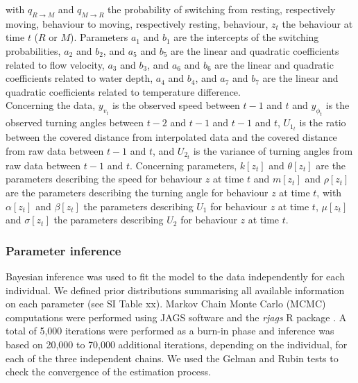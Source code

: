 \documentclass{article}
\begin{document}
\begin{linenumbers}
with $q_{R \rightarrow M}$ and $q_{M \rightarrow R}$ the probability of switching from resting, respectively moving, behaviour to moving, respectively resting, behaviour, $z_{t}$ the behaviour at time $t$ ($R$ or $M$). Parameters $a_{1}$ and $b_{1}$ are the intercepts of the switching probabilities, $a_{2}$ and $b_{2}$, and $a_{5}$ and $b_{5}$ are the linear and quadratic coefficients related to flow velocity, $a_{3}$ and $b_{3}$, and $a_{6}$ and $b_{6}$ are the linear and quadratic coefficients related to water depth, $a_{4}$ and $b_{4}$, and $a_{7}$ and $b_{7}$ are the linear and quadratic coefficients related to temperature difference.\\
Concerning the data, $y_{v_{t}}$ is the observed speed between $t-1$ and $t$ and $y_{\phi_{t}}$ is the observed turning angles between $t-2$ and $t-1$ and $t-1$ and $t$, $U_{1_{t}}$ is the ratio between the covered distance from interpolated data and the covered distance from raw data between $t-1$ and $t$, and $U_{2_{t}}$ is the variance of turning angles from raw data between $t-1$ and $t$. Concerning parameters, $k[z_{t}]$ and $\theta[z_{t}]$ are the parameters describing the speed for behaviour $z$ at time $t$ and $m[z_{t}]$ and $\rho[z_{t}]$ are the parameters describing the turning angle for behaviour $z$ at time $t$, with $\alpha[z_{t}]$ and $\beta[z_{t}]$ the parameters describing $U_{1}$ for behaviour $z$ at time $t$, $\mu[z_{t}]$ and $\sigma[z_{t}]$ the parameters describing $U_{2}$ for behaviour $z$ at time $t$.

\subsubsection{Parameter inference}
Bayesian inference was used to fit the model to the data independently for each individual. We defined prior 
distributions summarising all available information on each parameter (see SI Table xx). Markov Chain Monte 
Carlo (MCMC) computations were performed using JAGS software and the \textit{rjags} R package 
\cite{Plummer2009,R}. A total of 5,000 iterations were performed as a burn-in phase and inference was based on 
20,000 to 70,000 additional iterations, depending on the individual, for each of the three independent chains. 
We used the Gelman and Rubin tests \cite{Gelman1992} to check the convergence of the estimation process.



\end{linenumbers}
\end{document}

